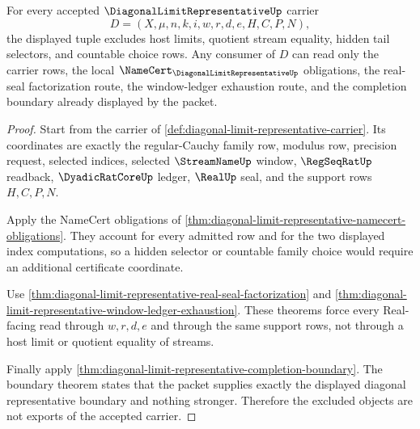 \begin{theorem}
\label{thm:diagonal-limit-representative-tail-selector-exclusion}
For every accepted $\DiagonalLimitRepresentativeUp$ carrier
$$
D=(X,\mu,n,k,i,w,r,d,e,H,C,P,N),
$$
the displayed tuple excludes host limits, quotient stream equality, hidden tail selectors, and countable choice rows. Any consumer of $D$ can read only the carrier rows, the local $\NameCert_{\DiagonalLimitRepresentativeUp}$ obligations, the real-seal factorization route, the window-ledger exhaustion route, and the completion boundary already displayed by the packet.
\end{theorem}
\begin{proof}
Start from the carrier of \autoref{def:diagonal-limit-representative-carrier}. Its coordinates are exactly the regular-Cauchy family row, modulus row, precision request, selected indices, selected $\StreamNameUp$ window, $\RegSeqRatUp$ readback, $\DyadicRatCoreUp$ ledger, $\RealUp$ seal, and the support rows $H,C,P,N$.

Apply the NameCert obligations of \autoref{thm:diagonal-limit-representative-namecert-obligations}. They account for every admitted row and for the two displayed index computations, so a hidden selector or countable family choice would require an additional certificate coordinate.

Use \autoref{thm:diagonal-limit-representative-real-seal-factorization} and \autoref{thm:diagonal-limit-representative-window-ledger-exhaustion}. These theorems force every Real-facing read through $w,r,d,e$ and through the same support rows, not through a host limit or quotient equality of streams.

Finally apply \autoref{thm:diagonal-limit-representative-completion-boundary}. The boundary theorem states that the packet supplies exactly the displayed diagonal representative boundary and nothing stronger. Therefore the excluded objects are not exports of the accepted carrier.
\end{proof}

